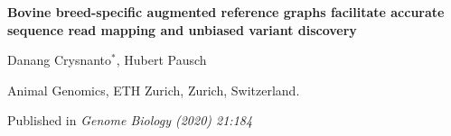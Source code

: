 \documentclass[../main.tex]{subfiles}
\begin{document}
\fi


\graphicspath{{figure/}{../figure/}}

\onehalfspacing

\begin{center}
\Large\bf{Bovine breed-specific augmented reference graphs facilitate accurate sequence read mapping and unbiased variant discovery}
\end{center}

\bigskip
\large{Danang Crysnanto$^{*}$, Hubert Pausch}

\bigskip 


\normalsize
Animal Genomics, ETH Zurich, Zurich, Switzerland. 


\vspace{2 cm}

\vspace{5 cm}

\bigskip
\large Published in \emph{Genome Biology (2020) 21:184}

\normalsize
\newpage
\end{document}

